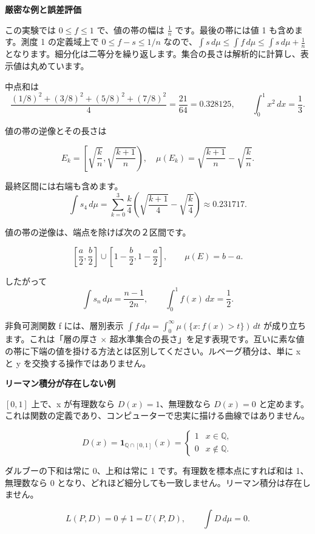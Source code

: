\documentclass[11pt,a4paper]{article}
\newcommand{\topic}[1]{\vspace{6pt}{\large\bfseries #1}\par}
\newcommand{\pagetitle}[1]{{\LARGE\bfseries #1}\par\vspace{9pt}}
\begin{document}
\pagetitle{厳密な例と誤差評価}

この実験では \(0\le f\le1\) で、値の帯の幅は \(\frac1n\) です。最後の帯には値 1 も含めます。測度 1 の定義域上で \(0\le f-s\le 1/n\) なので、\(\int s\,d\mu\le\int f\,d\mu\le\int s\,d\mu+\frac1n\) となります。細分化は二等分を繰り返します。集合の長さは解析的に計算し、表示値は丸めています。

\topic{$f(x)=x^2$, $n=4$}

中点和は\[\frac{(1/8)^2+(3/8)^2+(5/8)^2+(7/8)^2}{4}=\frac{21}{64}=0.328125,\qquad \int_0^1x^2\,dx=\frac13.\]

値の帯の逆像とその長さは

\[E_k=\left[\sqrt{\frac{k}{n}},\sqrt{\frac{k+1}{n}}\right),\quad \mu(E_k)=\sqrt{\frac{k+1}{n}}-\sqrt{\frac{k}{n}}.\]

最終区間には右端も含めます。\[\int s_4\,d\mu=\sum_{k=0}^3\frac{k}{4}\left(\sqrt{\frac{k+1}{4}}-\sqrt{\frac{k}{4}}\right)\approx0.231717.\]

\topic{$f(x)=1-|2x-1|$}

値の帯の逆像は、端点を除けば次の２区間です。

\[\left[\frac a2,\frac b2\right]\cup\left[1-\frac b2,1-\frac a2\right],\qquad \mu(E)=b-a.\]

したがって\[\int s_n\,d\mu=\frac{n-1}{2n},\qquad \int_0^1f(x)\,dx=\frac12.\]

\topic{関連する見方：水平な層}

非負可測関数 f には、層別表示 \(\int f\,d\mu=\int_0^\infty\mu(\{x:f(x)>t\})\,dt\) が成り立ちます。これは「層の厚さ × 超水準集合の長さ」を足す表現です。互いに素な値の帯に下端の値を掛ける方法とは区別してください。ルベーグ積分は、単に x と y を交換する操作ではありません。

\newpage

\pagetitle{リーマン積分が存在しない例}

\([0,1]\) 上で、x が有理数なら \(D(x)=1\)、無理数なら \(D(x)=0\) と定めます。これは関数の定義であり、コンピューターで忠実に描ける曲線ではありません。

\[D(x)=\mathbf1_{\mathbb Q\cap[0,1]}(x)=\begin{cases}1&x\in\mathbb Q,\\0&x\notin\mathbb Q.\end{cases}\]

ダルブーの下和は常に 0、上和は常に 1 です。有理数を標本点にすれば和は 1、無理数なら 0 となり、どれほど細分しても一致しません。リーマン積分は存在しません。

\[L(P,D)=0\ne1=U(P,D),\qquad \int D\,d\mu=0.\]
\end{document}
